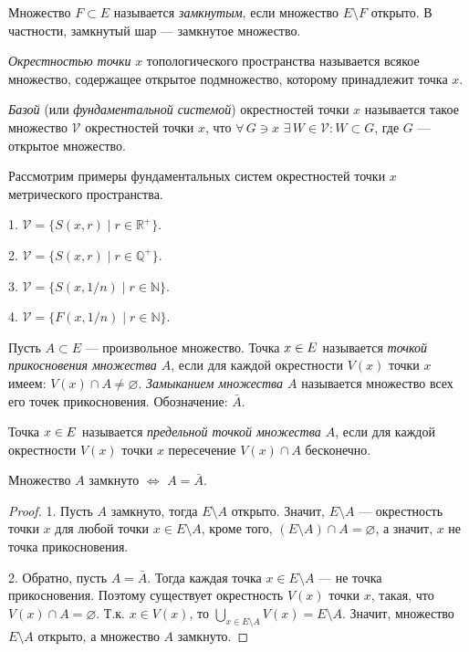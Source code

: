 \documentclass[10pt]{article}
\newcommand*{\p}[1]{#1\nobreak\discretionary{}{\hbox{$\mathsurround=0pt #1$}}{}}
\begin{document}
\begin{df}
Множество $F\subset E$ называется \emph{замкнутым}, если множество
$E\setminus F$ открыто. В частности, замкнутый шар --- замкнутое
множество.

\emph{Окрестностью точки} $x$ топологического пространства
называется всякое множество, содержащее открытое подмножество,
которому принадлежит точка $x$.
\end{df}

\begin{df}
\emph{Базой} (или \emph{фундаментальной системой}) окрестностей
точки $x$ называется такое множество $\mathcal{V}$ окрестностей
точки $x$, что $\forall\,G\ni x$ $\exists\,W\in\mathcal{V}:W\subset
G$, где $G$ --- открытое множество.
\end{df}

Рассмотрим примеры фундаментальных систем окрестностей точки $x$
метрического пространства.

\begin{ex}


  1. $\mathcal{V}=\{S(x,r)\mid r\in\mathbb{R}^+\}$.

  2. $\mathcal{V}=\{S(x,r)\mid r\in\mathbb{Q}^+\}$.

  3. $\mathcal{V}=\{S(x,1/n)\mid r\in\mathbb{N}\}$.

  4. $\mathcal{V}=\{F(x,1/n)\mid r\in\mathbb{N}\}$.
\end{ex}

\begin{df}
Пусть $A\subset E$ --- произвольное множество. Точка $x\p\in E$
называется \emph{точкой прикосновения множества $A$}, если для
каждой окрестности $V(x)$ точки $x$ имеем: $V(x)\cap
A\neq\varnothing$. \emph{Замыканием множества $A$} называется
множество всех его точек прикосновения. Обозначение: $\bar{A}$.

Точка $x\p\in E$ называется \emph{предельной точкой множества $A$},
если для каждой окрестности $V(x)$ точки $x$ пересечение $V(x)\cap
A$ бесконечно.
\end{df}

\begin{prop}
Множество $A$ замкнуто $\Leftrightarrow$ $A=\bar{A}$.
\end{prop}

\begin{proof}
1. Пусть $A$ замкнуто, тогда $E\setminus A$ открыто. Значит,
$E\setminus A$
--- окрестность точки $x$ для любой точки $x\in E\setminus A$,
кроме того, $(E\setminus A)\cap A=\varnothing$, а значит, $x$ не
точка прикосновения.

2. Обратно, пусть $A=\bar{A}$. Тогда каждая точка $x\in E\setminus
A$ --- не точка прикосновения. Поэтому существует окрестность $V(x)$
точки $x$, такая, что $V(x)\cap A=\varnothing$. Т.к. $x\in V(x)$, то
$\bigcup\limits_{x\in E\setminus A}V(x)=E\setminus A$. Значит,
множество $E\setminus A$ открыто, а множество $A$ замкнуто.
\end{proof}
\end{document}

